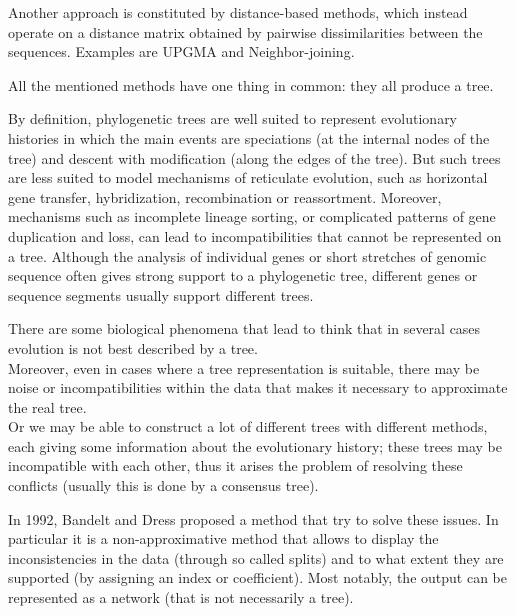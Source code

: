 \documentclass[./main.tex]{subfiles}
\begin{document}
Another approach is constituted by distance-based methods, which instead operate on a distance matrix obtained by pairwise dissimilarities between the sequences. Examples are UPGMA and Neighbor-joining.

All the mentioned methods have one thing in common: they all produce a tree.\bigskip

\begin{displayquote}
    By definition, phylogenetic trees are well suited to represent evolutionary histories in which the main events are speciations (at the internal nodes of the tree) and descent with modification (along the edges of the tree). But such trees are less suited to model mechanisms of reticulate evolution, such as horizontal gene transfer, hybridization, recombination or reassortment. Moreover, mechanisms such as incomplete lineage sorting, or complicated patterns of gene duplication and loss, can lead to incompatibilities that cannot be represented on a tree. Although the analysis of individual genes or short stretches of genomic sequence often gives strong support to a phylogenetic tree, different genes or sequence segments usually support different trees.
\end{displayquote}\bigskip

There are some biological phenomena that lead to think that in several cases evolution is not best described by a tree. \\
Moreover, even in cases where a tree representation is suitable, there may be noise or incompatibilities within the data that makes it necessary to approximate the real tree. \\
Or we may be able to construct a lot of different trees with different methods, each giving some information about the evolutionary history; these trees may be incompatible with each other, thus it arises the problem of resolving these conflicts (usually this is done by a consensus tree).

\clearpage

In 1992, Bandelt and Dress proposed a method that try to solve these issues. In particular it is a non-approximative method that allows to display the inconsistencies in the data (through so called splits) and to what extent they are supported (by assigning an index or coefficient). Most notably, the output can be represented as a network (that is not necessarily a tree).\bigskip
\end{document}
